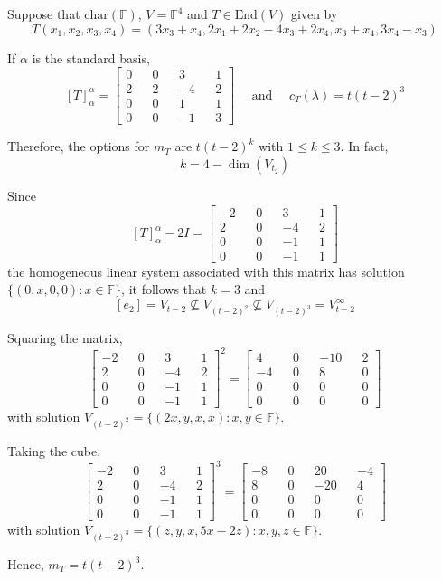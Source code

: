 \begin{example}\label{ex:canonical_forms_1}
	Suppose that $\text{char}(\mathbb{F})$, $V = \mathbb{F}^4$ and $T \in \text{End}(V)$ given by 
	\[
		T(x_1, x_2, x_3, x_4) = (3x_3 + x_4, 2x_1+2x_2 - 4x_3 + 2 x_4, x_3 + x_4, 3x_4 - x_3)
	\]
	
	If $\alpha$ is the standard basis,
	\[
		[T]_\alpha^\alpha = \begin{bmatrix}
		0 && 0 && 3 && 1 \\
		2 && 2 && -4 && 2 \\
		0 && 0 && 1 && 1 \\
		0 && 0 && -1 && 3
		\end{bmatrix}
		\quad \text{ and } \quad c_T(\lambda) = t(t-2)^3
	\]
	
	Therefore, the options for $m_T$ are $t(t-2)^k$ with $1 \leq k \leq 3$. In fact,
	\[
		k = 4 - \dim(V_{t_2})
	\]
	
	Since
	\[
		[T]_\alpha^\alpha - 2I = \begin{bmatrix}
		-2 && 0 && 3 && 1 \\
		2 && 0 && -4 && 2 \\
		0 && 0 && -1 && 1 \\
		0 && 0 && -1 && 1
		\end{bmatrix}
	\]
	the homogeneous linear system associated with this matrix has solution $\{ (0, x, 0, 0) : x \in \mathbb{F} \}$, it follows that $k = 3$ and 
	\[
		[e_2] = V_{t-2} \not\subseteq V_{(t-2)^2} \not\subseteq V_{(t-2)^3} = V_{t-2}^\infty
	\]
	
	Squaring the matrix,
	\[
		\begin{bmatrix}
		-2 && 0 && 3 && 1 \\
		2 && 0 && -4 && 2 \\
		0 && 0 && -1 && 1 \\
		0 && 0 && -1 && 1
		\end{bmatrix}^2
		= \begin{bmatrix}
		4 && 0 && -10 && 2 \\
		-4 && 0 && 8 && 0 \\
		0 && 0 && 0 && 0 \\
		0 && 0 && 0 && 0
		\end{bmatrix}
	\]
	with solution $V_{(t-2)^2} = \{ (2x, y, x, x) : x, y \in \mathbb{F} \}$.
	
	Taking the cube,
	\[
		\begin{bmatrix}
		-2 && 0 && 3 && 1 \\
		2 && 0 && -4 && 2 \\
		0 && 0 && -1 && 1 \\
		0 && 0 && -1 && 1
		\end{bmatrix}^3
		= \begin{bmatrix}
		-8 && 0 && 20 && -4 \\
		8 && 0 && -20 && 4 \\
		0 && 0 && 0 && 0 \\
		0 && 0 && 0 && 0
		\end{bmatrix}
	\]
	with solution $V_{(t-2)^3} = \{ (z, y, x, 5x-2z) : x, y, z \in \mathbb{F} \}$.
	
	Hence, $m_T = t(t-2)^3$.
\end{example}

